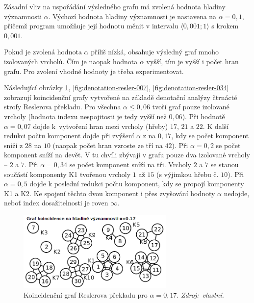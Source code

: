 \documentclass[dp.tex]{subfiles}
\begin{document}
Zásadní vliv na uspořádání výsledného grafu má zvolená hodnota hladiny významnosti $\alpha$. Výchozí hodnota hladiny významnosti je nastavena na $\alpha=0{,}1$, přičemž program umožňuje její hodnotu měnit v intervalu $\langle 0{,}001;1\rangle$ s krokem $0{,}001$.

Pokud je zvolená hodnota $\alpha$ příliš nízká, obsahuje výsledný graf mnoho izolovaných vrcholů. Čím je naopak hodnota $\alpha$ vyšší, tím je vyšší i počet hran grafu. Pro zvolení vhodné hodnoty je třeba experimentovat. 

Následující obrázky \ref{fig:denotation-resler-005}, \ref{fig:denotation-resler-007}, \ref{fig:denotation-resler-034}  zobrazují koincidenční grafy vytvořené na základě denotační analýzy čtrnácté strofy Reslerova překladu. Pro všechna $\alpha \leq 0{,}06$ tvoří graf pouze izolované vrcholy (hodnota indexu nespojitosti je tedy vyšší než $0{,}06$). Při hodnotě $\alpha = 0{,}07$ dojde k~vytvoření hran mezi vrcholy (hřeby) $17$, $21$ a $22$. K další redukci počtu komponent dojde při zvýšení $\alpha$ z na $0{,}17$, kdy se počet komponent sníží z $28$ na $10$ (naopak počet hran vzroste ze tří na $42$). Při $\alpha = 0{,}2$ se počet komponent sníží na devět. V tu chvíli zbývají v grafu pouze dva izolované vrcholy -- $2$ a $7$. Při $\alpha = 0{,}34$ se počet komponent sníží na tři. Vrcholy $2$ a $7$ se stanou součástí komponenty K1 tvořenou vrcholy $1$ až $15$ (s výjimkou hřebu č. $10$). Při $\alpha = 0{,}5$ dojde k poslední redukci počtu komponent, kdy se propojí komponenty K1 a K2. Ke spojení těchto dvou komponent i přes zvyšování hodnoty $\alpha$ nedojde, neboť index dosažitelnosti je roven $\infty$.

\begin{figure}[H]
	\centering
	\includegraphics[max width=\textwidth,height=150px,keepaspectratio=true]{imgs-70-prakticka/denotation-resler-017}
	\caption[Koincidenční graf Reslerova překladu pro $\alpha = 0{,}17$.]{Koincidenční graf Reslerova překladu pro $\alpha = 0{,}17$. \textit{Zdroj:~vlastní.}}
	\label{fig:denotation-resler-005}
\end{figure}
\end{document}

